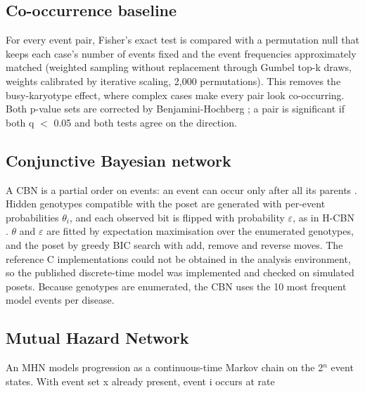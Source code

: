 \documentclass[conference]{IEEEtran}
\begin{document}
\subsection{Co-occurrence baseline}
For every event pair, Fisher's exact test is compared with a permutation null that keeps each case's number of events fixed and the event frequencies approximately matched (weighted sampling without replacement through Gumbel top-k draws, weights calibrated by iterative scaling, 2,000 permutations). This removes the busy-karyotype effect, where complex cases make every pair look co-occurring. Both p-value sets are corrected by Benjamini-Hochberg \cite{bh1995}; a pair is significant if both q $<$ 0.05 and both tests agree on the direction.

\subsection{Conjunctive Bayesian network}
A CBN is a partial order on events: an event can occur only after all its parents \cite{beerenwinkel2007}. Hidden genotypes compatible with the poset are generated with per-event probabilities $\theta_{i}$, and each observed bit is flipped with probability $\varepsilon$, as in H-CBN \cite{gerstung2009}. $\theta$ and $\varepsilon$ are fitted by expectation maximisation over the enumerated genotypes, and the poset by greedy BIC search with add, remove and reverse moves. The reference C implementations could not be obtained in the analysis environment, so the published discrete-time model was implemented and checked on simulated posets. Because genotypes are enumerated, the CBN uses the 10 most frequent model events per disease.

\subsection{Mutual Hazard Network}
An MHN \cite{schill2020} models progression as a continuous-time Markov chain on the 2$^n$ event states. With event set x already present, event i occurs at rate
\end{document}
